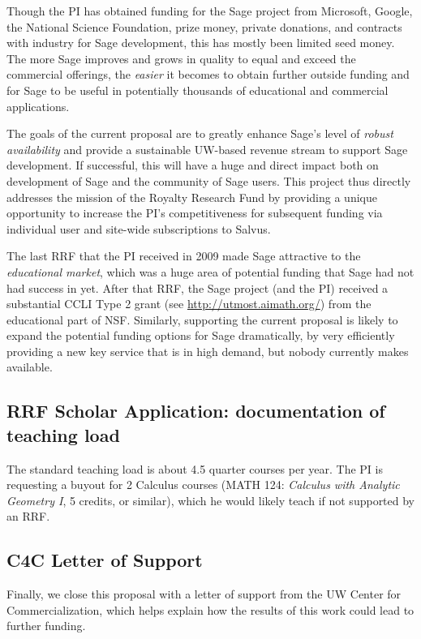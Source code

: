 \documentclass[11pt]{article}
\begin{document}
Though the PI has obtained funding for the Sage project from
Microsoft, Google, the National Science Foundation, prize money,
private donations, and contracts with industry for Sage development,
this has mostly been limited seed money.  The more Sage improves and
grows in quality to equal and exceed the commercial offerings, the
{\em easier} it becomes to obtain further outside funding and for Sage
to be useful in potentially thousands of educational and commercial
applications.

The goals of the current proposal are to greatly enhance Sage's level
of {\em robust availability} and provide a sustainable UW-based
revenue stream to support Sage development.  If successful, this will
have a huge and direct impact both on development of Sage and the
community of Sage users.  This project thus directly addresses the
mission of the Royalty Research Fund by providing a unique opportunity
to increase the PI's competitiveness for subsequent funding via
individual user and site-wide subscriptions to Salvus.

The last RRF that the PI received in 2009 made Sage attractive to the
{\em educational market}, which was a huge area of potential funding
that Sage had not had success in yet.  After that RRF, the Sage
project (and the PI) received a substantial CCLI Type 2 grant (see
\url{http://utmost.aimath.org/}) from the educational part of NSF.
Similarly, supporting the current proposal is likely to expand the
potential funding options for Sage dramatically, by very efficiently
providing a new key service that is in high demand, but nobody
currently makes available.

\subsection{RRF Scholar Application: documentation of teaching load}
The standard teaching load is about 4.5 quarter courses per year.  The
PI is requesting a buyout for 2 Calculus courses (MATH 124: {\em
  Calculus with Analytic Geometry I}, 5 credits, or similar), which he
would likely teach if not supported by an RRF.

\subsection{C4C Letter of Support}\label{sec:letter}
Finally, we close this proposal with a letter of support from the UW
Center for Commercialization, which helps explain how the results of
this work could lead to further funding.


\end{document}
